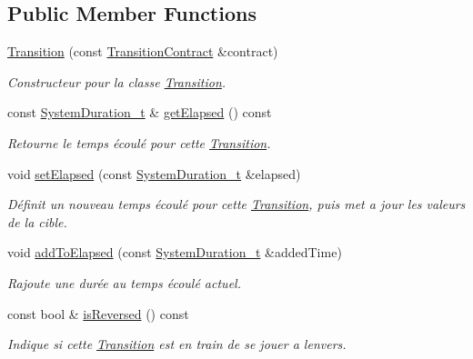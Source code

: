 \subsection*{Public Member Functions}
\begin{DoxyCompactItemize}
\item 
\hyperlink{classns_transition_1_1_transition_a7c3e692c43aceca5e4f716f3ae22bf05}{Transition} (const \hyperlink{classns_transition_1_1_transition_contract}{Transition\+Contract} \&contract)
\begin{DoxyCompactList}\small\item\em Constructeur pour la classe \hyperlink{classns_transition_1_1_transition}{Transition}. \end{DoxyCompactList}\item 
const \hyperlink{namespacens_transition_a260258f249f46ff9a62da721537f87af}{System\+Duration\+\_\+t} \& \hyperlink{classns_transition_1_1_transition_a616e0ef596d4e8ebb185a6cf0a685924}{get\+Elapsed} () const
\begin{DoxyCompactList}\small\item\em Retourne le temps écoulé pour cette \hyperlink{classns_transition_1_1_transition}{Transition}. \end{DoxyCompactList}\item 
void \hyperlink{classns_transition_1_1_transition_a0a8e848a50c2e05dc72800abfc6dd6ef}{set\+Elapsed} (const \hyperlink{namespacens_transition_a260258f249f46ff9a62da721537f87af}{System\+Duration\+\_\+t} \&elapsed)
\begin{DoxyCompactList}\small\item\em Définit un nouveau temps écoulé pour cette \hyperlink{classns_transition_1_1_transition}{Transition}, puis met a jour les valeurs de la cible. \end{DoxyCompactList}\item 
void \hyperlink{classns_transition_1_1_transition_abb421b44828c7b6dec60a0256a97b3d9}{add\+To\+Elapsed} (const \hyperlink{namespacens_transition_a260258f249f46ff9a62da721537f87af}{System\+Duration\+\_\+t} \&added\+Time)
\begin{DoxyCompactList}\small\item\em Rajoute une durée au temps écoulé actuel. \end{DoxyCompactList}\item 
const bool \& \hyperlink{classns_transition_1_1_transition_ab32ef25219cd2227746444ac8794266a}{is\+Reversed} () const
\begin{DoxyCompactList}\small\item\em Indique si cette \hyperlink{classns_transition_1_1_transition}{Transition} est en train de se jouer a l\textquotesingle{}envers. \end{DoxyCompactList}\item 

\end{DoxyCompactItemize}
